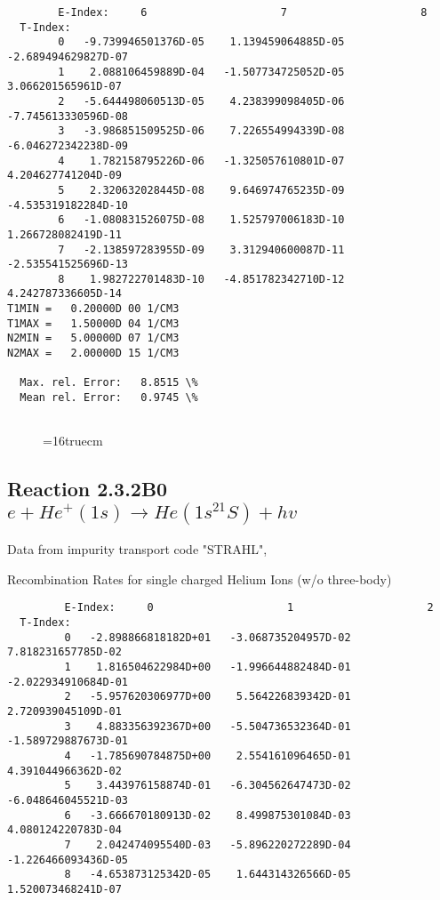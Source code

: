 \documentclass[12pt,dvipdfmx]{article}
\begin{document}
{\begin{small}
\begin{verbatim}
        E-Index:     6                     7                     8
  T-Index:
        0   -9.739946501376D-05    1.139459064885D-05   -2.689494629827D-07
        1    2.088106459889D-04   -1.507734725052D-05    3.066201565961D-07
        2   -5.644498060513D-05    4.238399098405D-06   -7.745613330596D-08
        3   -3.986851509525D-06    7.226554994339D-08   -6.046272342238D-09
        4    1.782158795226D-06   -1.325057610801D-07    4.204627741204D-09
        5    2.320632028445D-08    9.646974765235D-09   -4.535319182284D-10
        6   -1.080831526075D-08    1.525797006183D-10    1.266728082419D-11
        7   -2.138597283955D-09    3.312940600087D-11   -2.535541525696D-13
        8    1.982722701483D-10   -4.851782342710D-12    4.242787336605D-14
T1MIN =   0.20000D 00 1/CM3
T1MAX =   1.50000D 04 1/CM3
N2MIN =   5.00000D 07 1/CM3
N2MAX =   2.00000D 15 1/CM3

  Max. rel. Error:   8.8515 \%
  Mean rel. Error:   0.9745 \%


\end{verbatim}\end{small}
\begin{figure} \label{2.8A0}
\epsfxsize=16truecm 
\end{figure}
\newpage

\subsection{
Reaction 2.3.2B0  $e + He^+(1s) \rightarrow He(1s^21S) + hv$
}
Data from impurity transport code "STRAHL", \cite{kn:Behringer}

  Recombination Rates for single charged Helium Ions (w/o three-body)


\begin{small}\begin{verbatim}
         E-Index:     0                     1                     2
  T-Index:
         0   -2.898866818182D+01   -3.068735204957D-02    7.818231657785D-02
         1    1.816504622984D+00   -1.996644882484D-01   -2.022934910684D-01
         2   -5.957620306977D+00    5.564226839342D-01    2.720939045109D-01
         3    4.883356392367D+00   -5.504736532364D-01   -1.589729887673D-01
         4   -1.785690784875D+00    2.554161096465D-01    4.391044966362D-02
         5    3.443976158874D-01   -6.304562647473D-02   -6.048646045521D-03
         6   -3.666670180913D-02    8.499875301084D-03    4.080124220783D-04
         7    2.042474095540D-03   -5.896220272289D-04   -1.226466093436D-05
         8   -4.653873125342D-05    1.644314326566D-05    1.520073468241D-07


\end{verbatim}
\end{small}}
\end{document}

